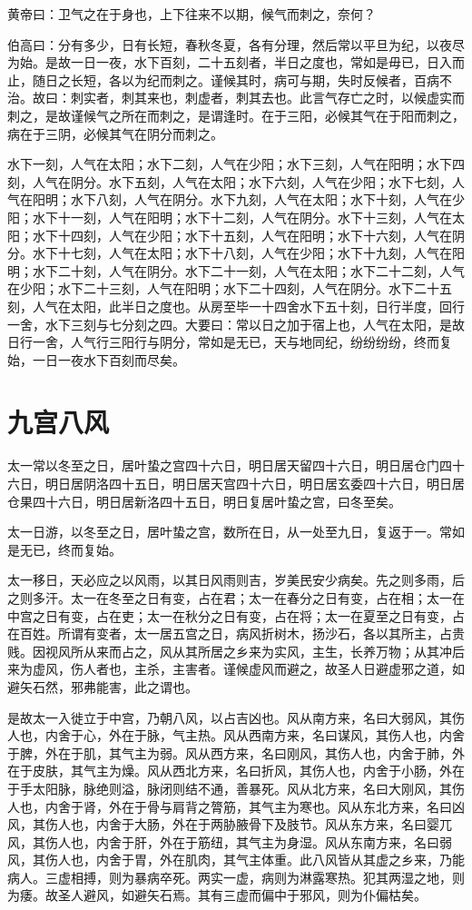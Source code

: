 \documentclass[a4paper,12pt,UTF8,twoside]{ctexbook}
\begin{document}
	黄帝曰：卫气之在于身也，上下往来不以期，候气而刺之，奈何？
	
	伯高曰：分有多少，日有长短，春秋冬夏，各有分理，然后常以平旦为纪，以夜尽为始。是故一日一夜，水下百刻，二十五刻者，半日之度也，常如是毋已，日入而止，随日之长短，各以为纪而刺之。谨候其时，病可与期，失时反候者，百病不治。故曰：刺实者，刺其来也，刺虚者，刺其去也。此言气存亡之时，以候虚实而刺之，是故谨候气之所在而刺之，是谓逢时。在于三阳，必候其气在于阳而刺之，病在于三阴，必候其气在阴分而刺之。
	
	水下一刻，人气在太阳；水下二刻，人气在少阳；水下三刻，人气在阳明；水下四刻，人气在阴分。水下五刻，人气在太阳；水下六刻，人气在少阳；水下七刻，人气在阳明；水下八刻，人气在阴分。水下九刻，人气在太阳；水下十刻，人气在少阳；水下十一刻，人气在阳明；水下十二刻，人气在阴分。水下十三刻，人气在太阳；水下十四刻，人气在少阳；水下十五刻，人气在阳明；水下十六刻，人气在阴分。水下十七刻，人气在太阳；水下十八刻，人气在少阳；水下十九刻，人气在阳明；水下二十刻，人气在阴分。水下二十一刻，人气在太阳；水下二十二刻，人气在少阳；水下二十三刻，人气在阳明；水下二十四刻，人气在阴分。水下二十五刻，人气在太阳，此半日之度也。从房至毕一十四舍水下五十刻，日行半度，回行一舍，水下三刻与七分刻之四。大要曰：常以日之加于宿上也，人气在太阳，是故日行一舍，人气行三阳行与阴分，常如是无已，天与地同纪，纷纷纷纷，终而复始，一日一夜水下百刻而尽矣。
	
	\chapter{九宫八风}
		
	太一常以冬至之日，居叶蛰之宫四十六日，明日居天留四十六日，明日居仓门四十六日，明日居阴洛四十五日，明日居天宫四十六日，明日居玄委四十六日，明日居仓果四十六日，明日居新洛四十五日，明日复居叶蛰之宫，曰冬至矣。
	
	太一日游，以冬至之日，居叶蛰之宫，数所在日，从一处至九日，复返于一。常如是无已，终而复始。
	
	太一移日，天必应之以风雨，以其日风雨则吉，岁美民安少病矣。先之则多雨，后之则多汗。太一在冬至之日有变，占在君；太一在春分之日有变，占在相；太一在中宫之日有变，占在吏；太一在秋分之日有变，占在将；太一在夏至之日有变，占在百姓。所谓有变者，太一居五宫之日，病风折树木，扬沙石，各以其所主，占贵贱。因视风所从来而占之，风从其所居之乡来为实风，主生，长养万物；从其冲后来为虚风，伤人者也，主杀，主害者。谨候虚风而避之，故圣人日避虚邪之道，如避矢石然，邪弗能害，此之谓也。
	
	是故太一入徙立于中宫，乃朝八风，以占吉凶也。风从南方来，名曰大弱风，其伤人也，内舍于心，外在于脉，气主热。风从西南方来，名曰谋风，其伤人也，内舍于脾，外在于肌，其气主为弱。风从西方来，名曰刚风，其伤人也，内舍于肺，外在于皮肤，其气主为燥。风从西北方来，名曰折风，其伤人也，内舍于小肠，外在于手太阳脉，脉绝则溢，脉闭则结不通，善暴死。风从北方来，名曰大刚风，其伤人也，内舍于肾，外在于骨与肩背之膂筋，其气主为寒也。风从东北方来，名曰凶风，其伤人也，内舍于大肠，外在于两胁腋骨下及肢节。风从东方来，名曰婴兀风，其伤人也，内舍于肝，外在于筋纽，其气主为身湿。风从东南方来，名曰弱风，其伤人也，内舍于胃，外在肌肉，其气主体重。此八风皆从其虚之乡来，乃能病人。三虚相搏，则为暴病卒死。两实一虚，病则为淋露寒热。犯其两湿之地，则为痿。故圣人避风，如避矢石焉。其有三虚而偏中于邪风，则为仆偏枯矣。
	
\end{document}
